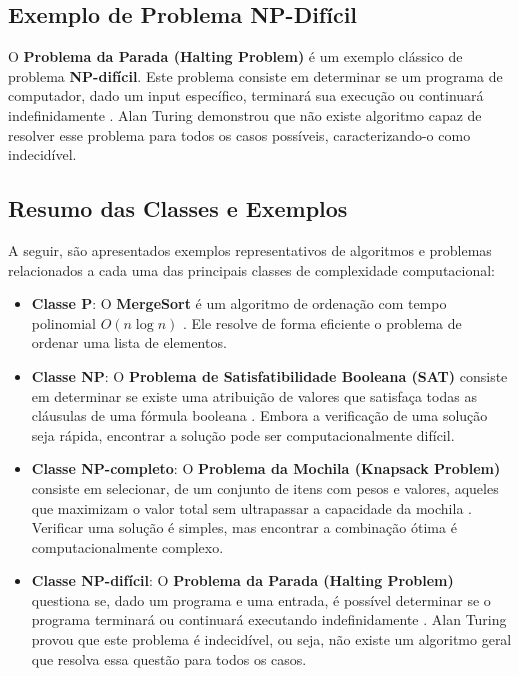 \documentclass[12pt,oneside,a4paper]{report}
\begin{document}
\subsection{Exemplo de Problema NP-Difícil}

O \textbf{Problema da Parada (Halting Problem)} é um exemplo clássico de problema \textbf{NP-difícil}. Este problema consiste em determinar se um programa de computador, dado um input específico, terminará sua execução ou continuará indefinidamente \cite{sipser2012}. Alan Turing demonstrou que não existe algoritmo capaz de resolver esse problema para todos os casos possíveis, caracterizando-o como indecidível.

\subsection{Resumo das Classes e Exemplos}

A seguir, são apresentados exemplos representativos de algoritmos e problemas relacionados a cada uma das principais classes de complexidade computacional:

\begin{itemize}
    \item \textbf{Classe P}: O \textbf{MergeSort} é um algoritmo de ordenação com tempo polinomial \(O(n \log n)\) \cite{cormen2022, knuth1998}. Ele resolve de forma eficiente o problema de ordenar uma lista de elementos.
    
    \item \textbf{Classe NP}: O \textbf{Problema de Satisfatibilidade Booleana (SAT)} consiste em determinar se existe uma atribuição de valores que satisfaça todas as cláusulas de uma fórmula booleana \cite{garey1979}. Embora a verificação de uma solução seja rápida, encontrar a solução pode ser computacionalmente difícil.
    
    \item \textbf{Classe NP-completo}: O \textbf{Problema da Mochila (Knapsack Problem)} consiste em selecionar, de um conjunto de itens com pesos e valores, aqueles que maximizam o valor total sem ultrapassar a capacidade da mochila \cite{garey1979}. Verificar uma solução é simples, mas encontrar a combinação ótima é computacionalmente complexo.
    
    \item \textbf{Classe NP-difícil}: O \textbf{Problema da Parada (Halting Problem)} questiona se, dado um programa e uma entrada, é possível determinar se o programa terminará ou continuará executando indefinidamente \cite{sipser2012}. Alan Turing provou que este problema é indecidível, ou seja, não existe um algoritmo geral que resolva essa questão para todos os casos.
\end{itemize}
\end{document}
